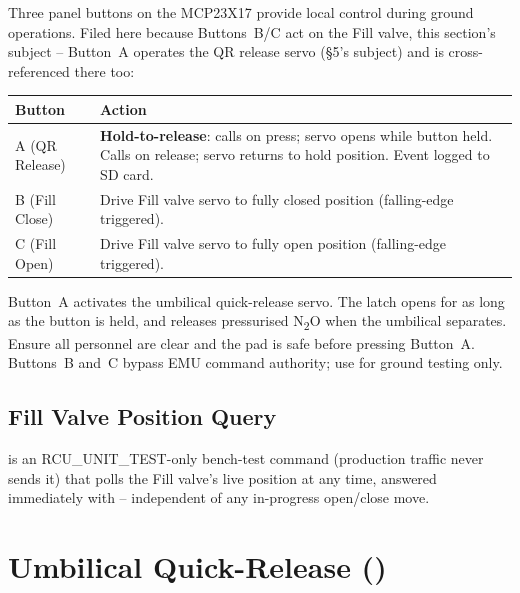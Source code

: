 ﻿\documentclass[11pt,letterpaper]{article}
\begin{document}
Three panel buttons on the MCP23X17 provide local control during ground
operations. Filed here because Buttons~B/C act on the Fill valve, this
section's subject -- Button~A operates the QR release servo (§5's
subject) and is cross-referenced there too:

\begin{center}
\begin{tabularx}{\textwidth}{@{}lY@{}}
\toprule
Button & Action \\
\midrule
A (QR Release) & \textbf{Hold-to-release}: calls  on press; servo opens
                 while button held.  Calls  on release; servo returns to
                 hold position.  Event logged to SD card. \\
B (Fill Close) & Drive Fill valve servo to fully closed position (falling-edge triggered). \\
C (Fill Open)  & Drive Fill valve servo to fully open position (falling-edge triggered). \\
\bottomrule
\end{tabularx}
\end{center}

\begin{warningbox}
Button~A activates the umbilical quick-release servo.  The latch opens for
as long as the button is held, and releases pressurised
N\textsubscript{2}O when the umbilical separates.  Ensure all personnel are
clear and the pad is safe before pressing Button~A.
Buttons~B and~C bypass EMU command authority; use for ground testing only.
\end{warningbox}

\subsection{Fill Valve Position Query}

\begin{sloppypar}
 is an RCU\_UNIT\_TEST-only bench-test
command (production traffic never sends it) that polls the Fill valve's
live position at any time, answered immediately with
 -- independent of any in-progress
open/close move.
\end{sloppypar}

\section{Umbilical Quick-Release ()}
\end{document}
